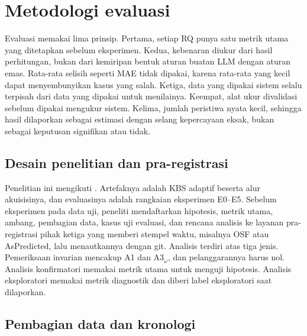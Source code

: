 \section{Metodologi evaluasi}
\label{sec:evaluasi}

Evaluasi memakai lima prinsip. Pertama, setiap RQ punya satu metrik utama yang ditetapkan sebelum eksperimen. Kedua, kebenaran diukur dari hasil perhitungan, bukan dari kemiripan bentuk aturan buatan LLM dengan aturan emas. Rata-rata selisih seperti MAE tidak dipakai, karena rata-rata yang kecil dapat menyembunyikan kasus yang salah. Ketiga, data yang dipakai sistem selalu terpisah dari data yang dipakai untuk menilainya. Keempat, alat ukur divalidasi sebelum dipakai mengukur sistem. Kelima, jumlah peristiwa nyata kecil, sehingga hasil dilaporkan sebagai estimasi dengan selang kepercayaan eksak, bukan sebagai keputusan signifikan atau tidak.


\subsection{Desain penelitian dan pra-registrasi}
\label{subsec:desain}

Penelitian ini mengikuti . Artefaknya adalah KBS adaptif beserta alur akuisisinya, dan evaluasinya adalah rangkaian eksperimen E0--E5. Sebelum eksperimen pada data uji, peneliti mendaftarkan hipotesis, metrik utama, ambang, pembagian data, kasus uji evaluasi, dan rencana analisis ke layanan pra-registrasi pihak ketiga yang memberi stempel waktu, misalnya OSF atau AsPredicted, lalu menautkannya dengan  git. Analisis terdiri atas tiga jenis. Pemeriksaan invarian mencakup A1 dan A3$_\omega$, dan pelanggarannya harus nol. Analisis konfirmatori memakai metrik utama untuk menguji hipotesis. Analisis eksploratori memakai metrik diagnostik dan diberi label eksploratori saat dilaporkan.

\subsection{Pembagian data dan kronologi}
\label{subsec:pembagian}


